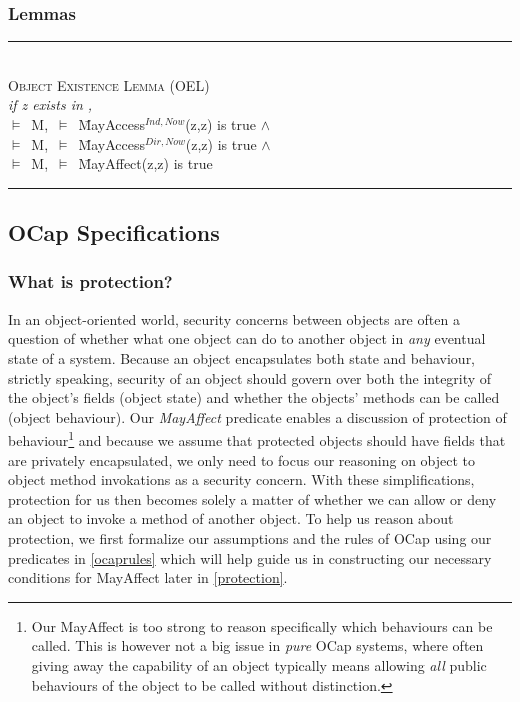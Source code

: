 \documentclass[a4paper,11pt, twoside,twocolumn]{article}
\newenvironment{logic}
{\begin{minipage}[c]{\linewidth}  \small \vspace{0.5em}\begin{tabbing}}
{\end{tabbing}\end{minipage}\vspace{0.5em}}
\newcommand{\loand}{$\land$}
\newcommand{\losigma}{\text{$\upsigma$}}
\newcommand{\loturns} {$\vDash$}
\newcommand{\hr}{\rule{\linewidth}{0.4pt}}
\begin{document}
\subsubsection{Lemmas}
\begin{logic}
\hr\\
\textsc{\normalsize *Object Existence Lemma (OEL)}\\
\textit{if z exists in \losigma,} \\
\loturns\ M,\losigma\ \loturns\ \=MayAccess$^{Ind,Now}$(z,z) is true \loand\\
\loturns\ M,\losigma\ \loturns\ \=MayAccess$^{Dir,Now}$(z,z) is true \loand\\
\loturns\ M,\losigma\ \loturns\ \=MayAffect(z,z) is true\\
\hr
\end{logic}

\subsection{OCap Specifications}


\subsubsection{What is protection?}
In an object-oriented world, security concerns between objects are often a question of whether what one object can do to another object in \textit{any} eventual state of a system. Because an object encapsulates both state and behaviour, strictly speaking, security of an object should govern over both the integrity of the object's fields (object state) and whether the objects' methods can be called (object behaviour). Our \textit{MayAffect} predicate enables a discussion of protection of behaviour\footnote{ Our MayAffect is too strong to reason specifically which behaviours can be called. This is however not a big issue in \textit{pure} OCap systems, where often giving away the capability of an object typically means allowing \textit{all} public behaviours of the object to be called without distinction.}
and because we assume that protected objects should have fields that are privately encapsulated, we only need to focus our reasoning on object to object method invokations as a security concern. With these simplifications, protection for us then becomes solely a matter of whether we can allow or deny an object to invoke a method of another object. To help us reason about protection, we first formalize our assumptions and the rules of OCap using our predicates in \ref{ocaprules} which will help guide us in constructing our necessary conditions for MayAffect later in \ref{protection}.
\end{document}
